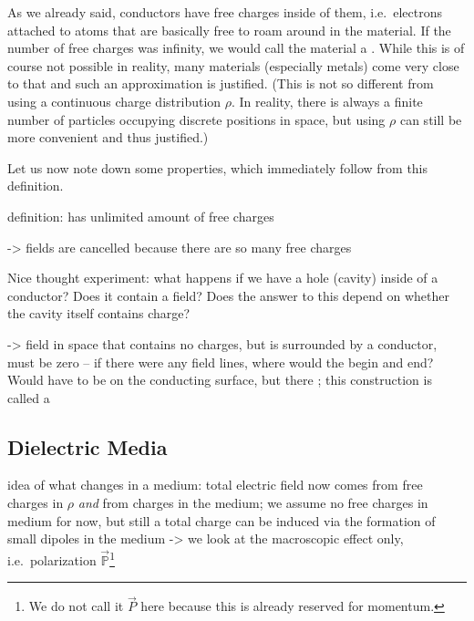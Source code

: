 \documentclass[../class_mech_main.tex]{subfiles}
\begin{document}
As we already said, conductors have free charges inside of them, i.e.~electrons attached to atoms that are basically free to roam around in the material. If the number of free charges was infinity, we would call the material a . While this is of course not possible in reality, many materials (especially metals) come very close to that and such an approximation is justified. (This is not so different from using a continuous charge distribution $\rho$. In reality, there is always a finite number of particles occupying discrete positions in space, but using $\rho$ can still be more convenient and thus justified.)

Let us now note down some properties, which immediately follow from this definition.

definition: has unlimited amount of free charges


-> fields are cancelled because there are so many free charges


Nice thought experiment: what happens if we have a hole (cavity) inside of a conductor? Does it contain a field? Does the answer to this depend on whether the cavity itself contains charge?

-> field in space that contains no charges, but is surrounded by a conductor, must be zero -- if there were any field lines, where would the begin and end? Would have to be on the conducting surface, but there ; this construction is called a 



        \subsection{Dielectric Media}



idea of what changes in a medium: total electric field now comes from free charges in $\rho$ \emph{and} from charges in the medium; we assume no free charges in medium for now, but still a total charge can be induced via the formation of small dipoles in the medium -> we look at the macroscopic effect only, i.e.~polarization $\vec{\mathbb{P}}$\footnote{We do not call it $\vec{P}$ here because this is already reserved for momentum.}
\end{document}
